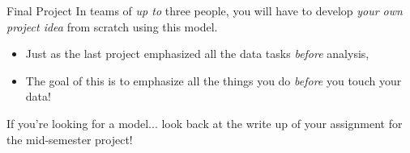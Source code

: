 \documentclass[11pt]{beamer}
\begin{document}
\begin{frame}[c]{Final Project}
  In teams of \emph{up to} three people, \pause you will have to develop \emph{your own project idea} from scratch using this model.
  \begin{itemize}
    \item Just as the last project emphasized all the data tasks \emph{before} analysis,
    \pause \item The goal of this is to emphasize all the things you do \emph{before} you touch your data!
  \end{itemize}
  \vspace*{0.1cm}
  If you're looking for a model... look back at the write up of your assignment for the mid-semester project!
\end{frame}
\end{document}
